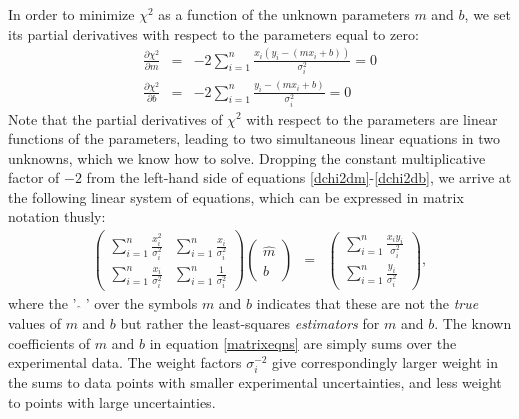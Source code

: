 \documentclass{article}
\begin{document}
In order to minimize $\chi^2$ as a function of the unknown parameters $m$ and $b$, we set its partial derivatives with respect to the parameters equal to zero:
\begin{eqnarray}
  \frac{\partial \chi^2}{\partial m} &=& -2\sum_{i=1}^{n} \frac{x_i(y_i - (mx_i + b))}{\sigma_i^2} = 0 \label{dchi2dm} \\
  \frac{\partial \chi^2}{\partial b} &=& -2\sum_{i=1}^{n} \frac{y_i - (mx_i+b)}{\sigma_i^2} = 0 \label{dchi2db}
\end{eqnarray}
Note that the partial derivatives of $\chi^2$ with respect to the parameters are linear functions of the parameters, leading to two simultaneous linear equations in two unknowns, which we know how to solve. Dropping the constant multiplicative factor of $-2$ from the left-hand side of equations \eqref{dchi2dm}-\eqref{dchi2db}, we arrive at the following linear system of equations, which can be expressed in matrix notation thusly:
\begin{eqnarray}
  \left(\begin{array}{cc} \sum_{i=1}^{n} \frac{x_i^2}{\sigma_i^2} & \sum_{i=1}^{n} \frac{x_i}{\sigma_i^2} \\ \sum_{i=1}^{n} \frac{x_i}{\sigma_i^2} & \sum_{i=1}^{n} \frac{1}{\sigma_i^2} \end{array}\right)\left(\begin{array}{c} \hat{m} \\ \hat{b} \end{array}\right) &=& \left(\begin{array}{c} \sum_{i=1}^{n} \frac{x_i y_i}{\sigma_i^2} \\ \sum_{i=1}^{n} \frac{y_i}{\sigma_i^2} \end{array}\right), \label{matrixeqns}
\end{eqnarray}
where the ' $\hat{}$ ' over the symbols $m$ and $b$ indicates that these are not the \emph{true} values of $m$ and $b$ but rather the least-squares \emph{estimators} for $m$ and $b$. The known coefficients of $m$ and $b$ in equation \eqref{matrixeqns} are simply sums over the experimental data. The weight factors $\sigma_i^{-2}$ give correspondingly larger weight in the sums to data points with smaller experimental uncertainties, and less weight to points with large uncertainties. 
\end{document}
